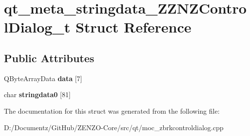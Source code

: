 \hypertarget{structqt__meta__stringdata___z_z_n_z_control_dialog__t}{}\section{qt\+\_\+meta\+\_\+stringdata\+\_\+\+Z\+Z\+N\+Z\+Control\+Dialog\+\_\+t Struct Reference}
\label{structqt__meta__stringdata___z_z_n_z_control_dialog__t}
\subsection*{Public Attributes}
\begin{DoxyCompactItemize}
\item 
\mbox{\label{structqt__meta__stringdata___z_z_n_z_control_dialog__t_ab9c7935588db4e30424ed045ba5ad748}} 
Q\+Byte\+Array\+Data {\bfseries data} \mbox{[}7\mbox{]}
\item 
\mbox{\label{structqt__meta__stringdata___z_z_n_z_control_dialog__t_abae99395f381b2119eaa349a221aca17}} 
char {\bfseries stringdata0} \mbox{[}81\mbox{]}
\end{DoxyCompactItemize}


The documentation for this struct was generated from the following file\+:\begin{DoxyCompactItemize}
\item 
D\+:/\+Documentz/\+Git\+Hub/\+Z\+E\+N\+Z\+O-\/\+Core/src/qt/moc\+\_\+zbrkcontroldialog.\+cpp\end{DoxyCompactItemize}
